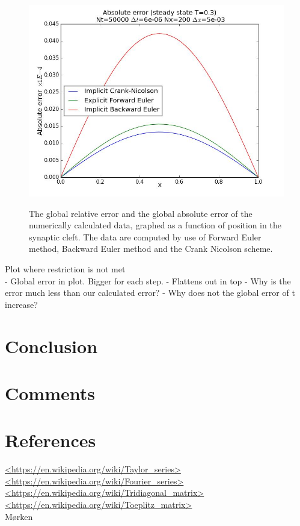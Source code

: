 \documentclass[12pt]{article}
\begin{document}
\begin{flushleft}
\begin{figure}[!h]
\begin{minipage}{\linewidth}
     {\includegraphics[scale=0.27]{abs_error_all}}
    \caption{The global relative error and the global absolute error of the numerically calculated data, graphed as a function of position in the synaptic cleft. The data are computed by use of Forward Euler method, Backward Euler method and the Crank Nicolson scheme.}
  \end{minipage}
\end{figure}

Plot where restriction is not met\\
- Global error in plot. Bigger for each step.
- Flattens out in top
- Why is the error much less than our calculated error?
- Why does not the global error of t increase?

\newpage
\section{Conclusion}

\section{Comments}

\section{References}
\url{<https://en.wikipedia.org/wiki/Taylor_series>}\\
\url{<https://en.wikipedia.org/wiki/Fourier_series>}\\
\url{<https://en.wikipedia.org/wiki/Tridiagonal_matrix>}\\
\url{<https://en.wikipedia.org/wiki/Toeplitz_matrix>}\\
Mørken

\end{flushleft}
\end{document}
